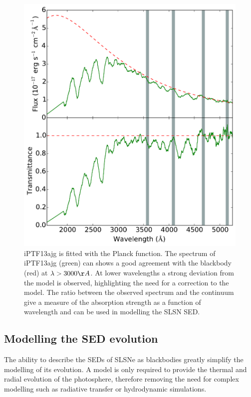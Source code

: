 \begin{figure}
\centering
\includegraphics[width=\textwidth]{Figures/Chapter4/specTemplate}
\caption{iPTF13ajg is fitted with the Planck function. The spectrum of iPTF13ajg (green) can shows a good agreement with the blackbody (red) at $\lambda>3000\AA$. At lower wavelengths a strong deviation from the model is observed, highlighting the need for a correction to the model. The ratio between the observed spectrum and the continuum give a measure of the absorption strength as a function of wavelength and can be used in modelling the SLSN SED.}
\label{fig:specTemplate}
\end{figure}

\subsection{Modelling the SED evolution}
The ability to describe the SEDs of SLSNe as blackbodies greatly simplify the
modelling of its evolution. A model is only required to provide the thermal and radial evolution of the photosphere, therefore removing the need for complex modelling such as radiative transfer or hydrodynamic simulations.

